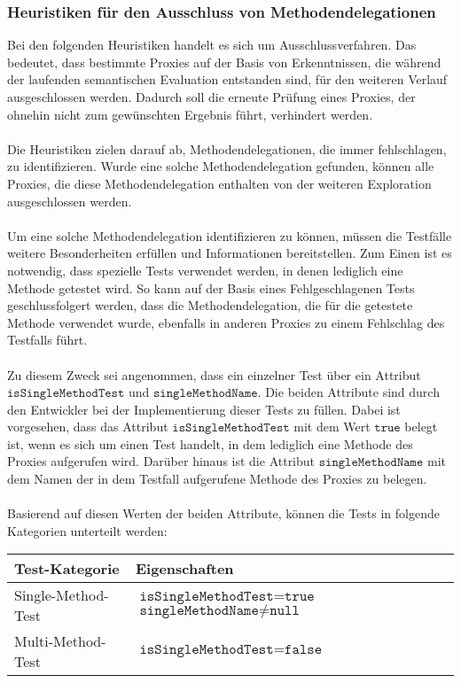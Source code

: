 \documentclass[a4paper,12pt]{article}
\begin{document}
\subsubsection{Heuristiken für den Ausschluss von Methodendelegationen}
Bei den folgenden Heuristiken handelt es sich um Ausschlussverfahren. Das bedeutet, dass bestimmte Proxies auf der Basis von Erkenntnissen, die während der laufenden semantischen Evaluation entstanden sind, für den weiteren Verlauf ausgeschlossen werden. Dadurch soll die erneute Prüfung eines Proxies, der ohnehin nicht zum gewünschten Ergebnis führt, verhindert werden.
\\\\
Die Heuristiken zielen darauf ab, Methodendelegationen, die immer fehlschlagen, zu identifizieren. Wurde eine solche Methodendelegation gefunden, können alle Proxies, die diese Methodendelegation enthalten von der weiteren Exploration ausgeschlossen werden.
\\\\
Um eine solche Methodendelegation identifizieren zu können, müssen die Testfälle weitere Besonderheiten erfüllen und Informationen bereitstellen. Zum Einen ist es notwendig, dass spezielle Tests verwendet werden, in denen lediglich eine Methode getestet wird. So kann auf der Basis eines Fehlgeschlagenen Tests geschlussfolgert werden, dass die Methodendelegation, die für die getestete Methode verwendet wurde, ebenfalls in anderen Proxies zu einem Fehlschlag des Testfalls führt.
\\\\
Zu diesem Zweck sei angenommen, dass ein einzelner Test über ein Attribut $\texttt{isSingleMethodTest}$ und $\texttt{singleMethodName}$. Die beiden Attribute sind durch den Entwickler bei der Implementierung dieser Tests zu füllen. Dabei ist vorgesehen, dass das Attribut $\texttt{isSingleMethodTest}$ mit dem Wert $\texttt{true}$ belegt ist, wenn es sich um einen Test handelt, in dem lediglich eine Methode des Proxies aufgerufen wird. Darüber hinaus ist die Attribut $\texttt{singleMethodName}$ mit dem Namen der in dem Testfall aufgerufene Methode des Proxies zu belegen.
\\\\
Basierend auf diesen Werten der beiden Attribute, können die Tests in folgende Kategorien unterteilt werden:
\begin{table}[H]
\centering
\begin{tabular}{|p{5.5cm}|p{6.5cm}|}
\hline
\hline
\textbf{Test-Kategorie} & \textbf{Eigenschaften} \\
\hline
Single-Method-Test 
& 
$\texttt{isSingleMethodTest} = \texttt{true}$\newline
$\texttt{singleMethodName} \neq \texttt{null}$ \\
\hline
Multi-Method-Test 
& 
$\texttt{isSingleMethodTest} = \texttt{false}$\\
\hline
\hline
\end{tabular}

\end{table}
\end{document}

